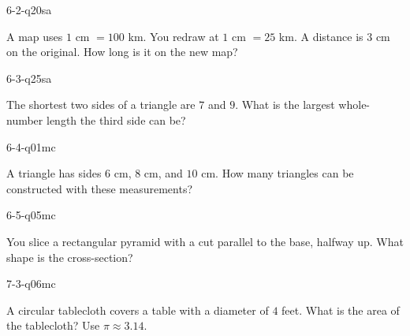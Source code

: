 \begin{practiceQuestion}{6-2-q20}{sa}
\begin{questionText}
A map uses $1$ cm $= 100$ km. You redraw at $1$ cm $= 25$ km. A distance is $3$ cm on the original. How long is it on the new map?
\end{questionText}
\end{practiceQuestion}

\begin{practiceQuestion}{6-3-q25}{sa}
\begin{questionText}
The shortest two sides of a triangle are $7$ and $9$. What is the largest whole-number length the third side can be?
\end{questionText}
\end{practiceQuestion}

\begin{practiceQuestion}{6-4-q01}{mc}
\begin{questionText}
A triangle has sides $6$ cm, $8$ cm, and $10$ cm. How many triangles can be constructed with these measurements?
\end{questionText}
\end{practiceQuestion}

\begin{practiceQuestion}{6-5-q05}{mc}
\begin{questionText}
You slice a rectangular pyramid with a cut parallel to the base, halfway up. What shape is the cross-section?
\end{questionText}
\end{practiceQuestion}

\begin{practiceQuestion}{7-3-q06}{mc}
\begin{questionText}
A circular tablecloth covers a table with a diameter of $4$ feet. What is the area of the tablecloth? Use $\pi \approx 3.14$.
\end{questionText}
\end{practiceQuestion}

